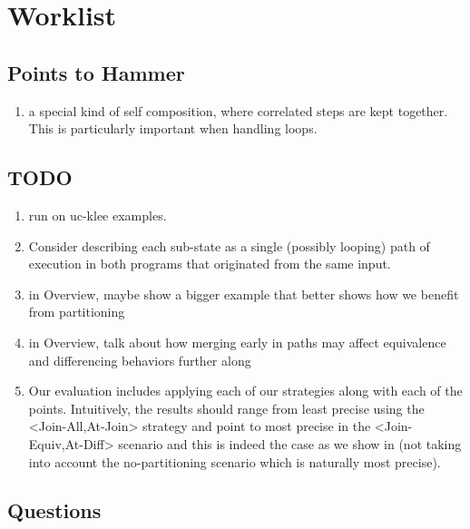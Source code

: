 \section{Worklist}

\subsection{Points to Hammer}

\begin{enumerate}
\item a special kind of self composition, where correlated steps are kept together. This is particularly important when handling loops.
\end{enumerate}

\subsection{TODO}
\begin{enumerate}
\item run on uc-klee examples.
\item Consider describing each sub-state as a single (possibly looping) path of execution in both programs that originated from the same input.
\item in Overview, maybe show a bigger example that better shows how we benefit from partitioning
\item in Overview, talk about how merging early in paths may affect equivalence and differencing behaviors further along
\item Our evaluation includes applying each of our strategies along with each of the points. Intuitively, the results should range from least precise using the <Join-All,At-Join> strategy and point to most precise in the <Join-Equiv,At-Diff> scenario and this is indeed the case as we show in  (not taking into account the no-partitioning scenario which is naturally most precise).
\end{enumerate}


\subsection{Questions}

